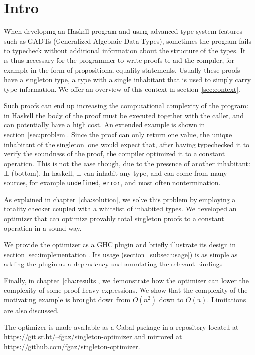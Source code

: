 \chapter{Intro}
\label{cha:intro}

When developing an Haskell program and using advanced type system features such as GADTs (Generalized Algebraic Data Types), sometimes the program fails to typecheck without additional information about the structure of the types.
It is thus necessary for the programmer to write proofs to aid the compiler, for example in the form of propositional equality statements.
Usually these proofs have a singleton type, a type with a single inhabitant that is used to simply carry type information.
We offer an overview of this context in section~\ref{sec:context}.

Such proofs can end up increasing the computational complexity of the program: in Haskell the body of the proof must be executed together with the caller, and can potentially have a high cost.
An extended example is shown in section~\ref{sec:problem}.
Since the proof can only return one value, the unique inhabitant of the singleton, one would expect that, after having typechecked it to verify the soundness of the proof, the compiler optimized it to a constant operation.
This is not the case though, due to the presence of another inhabitant: $\bot$ (bottom).
In haskell, $\bot$ can inhabit any type, and can come from many sources, for example \texttt{undefined}, \texttt{error}, and most often nontermination.

As explained in chapter~\ref{cha:solution}, we solve this problem by employing a totality checker coupled with a whitelist of inhabited types.
We developed an optimizer that can optimize provably total singleton proofs to a constant operation in a sound way.

We provide the optimizer as a GHC plugin and briefly illustrate its design in section \ref{sec:implementation}.
Its usage (section~\ref{subsec:usage}) is as simple as adding the plugin as a dependency and annotating the relevant bindings.

Finally, in chapter~\ref{cha:results}, we demonstrate how the optimizer can lower the complexity of some proof-heavy expressions.
We show that the complexity of the motivating example is brought down from $O(n^2)$ down to $O(n)$.
Limitations are also discussed.

The optimizer is made available as a Cabal package in a repository located at \url{https://git.sr.ht/~fgaz/singleton-optimizer} and mirrored at \url{https://github.com/fgaz/singleton-optimizer}.

